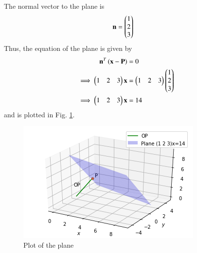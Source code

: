 The normal vector to the plane is 
\begin{align}
\mathbf{n} &= \begin{pmatrix}1\\2\\3\end{pmatrix}
\end{align}
Thus, the equation of the plane is given by
\begin{align}
\mathbf{n}^T\left(\mathbf{x}-\mathbf{P}\right) &= 0
\\
\implies \begin{pmatrix}1 & 2 & 3\end{pmatrix}{\mathbf{x}} &= \begin{pmatrix}1 & 2 & 3\end{pmatrix}{\ensuremath{\begin{pmatrix}1\\2\\3\end{pmatrix}}}
\\
\implies \begin{pmatrix}1 & 2 & 3\end{pmatrix}{\mathbf{x}} &= 14
\end{align}
%
and is plotted in Fig. \ref{linform/2/55/Plot of the plane}.
\begin{figure}[!ht]
\centering
\includegraphics[width=\columnwidth]{solutions/su2021/2/55/PLANE.png}
\caption{Plot of the plane}
\label{linform/2/55/Plot of the plane}
\end{figure}


